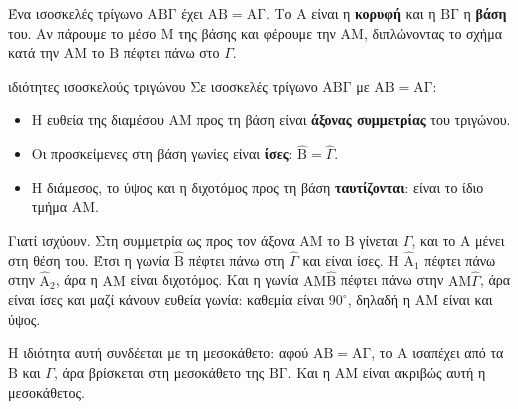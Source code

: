 

Ένα ισοσκελές τρίγωνο $\mathrm{ΑΒΓ}$ έχει $\mathrm{ΑΒ}=\mathrm{ΑΓ}$. Το $\mathrm{Α}$ είναι η \textbf{κορυφή} και η $\mathrm{ΒΓ}$ η \textbf{βάση} του. Αν πάρουμε το μέσο $\mathrm{Μ}$ της βάσης και φέρουμε την $\mathrm{ΑΜ}$, διπλώνοντας το σχήμα κατά την $\mathrm{ΑΜ}$ το $\mathrm{Β}$ πέφτει πάνω στο $\Gamma$.

\begin{center}
\end{center}

\begin{kanonas}{ιδιότητες ισοσκελούς τριγώνου}
Σε ισοσκελές τρίγωνο $\mathrm{ΑΒΓ}$ με $\mathrm{ΑΒ}=\mathrm{ΑΓ}$:
\begin{itemize}[leftmargin=1.2em,itemsep=0.3ex,topsep=2pt]
\item Η ευθεία της διαμέσου $\mathrm{ΑΜ}$ προς τη βάση είναι \textbf{άξονας συμμετρίας} του τριγώνου.
\item Οι προσκείμενες στη βάση γωνίες είναι \textbf{ίσες}: $\hat{\mathrm{Β}}=\hat{\Gamma}$.
\item Η διάμεσος, το ύψος και η διχοτόμος προς τη βάση \textbf{ταυτίζονται}: είναι το ίδιο τμήμα $\mathrm{ΑΜ}$.
\end{itemize}
\end{kanonas}

Γιατί ισχύουν. Στη συμμετρία ως προς τον άξονα $\mathrm{ΑΜ}$ το $\mathrm{Β}$ γίνεται $\Gamma$, και το $\mathrm{Α}$ μένει στη θέση του. Έτσι η γωνία $\hat{\mathrm{Β}}$ πέφτει πάνω στη $\hat{\Gamma}$ και είναι ίσες. Η $\hat{\mathrm{Α}}_1$ πέφτει πάνω στην $\hat{\mathrm{Α}}_2$, άρα η $\mathrm{ΑΜ}$ είναι διχοτόμος. Και η γωνία $\mathrm{ΑΜ}\hat{\mathrm{Β}}$ πέφτει πάνω στην $\mathrm{ΑΜ}\hat{\Gamma}$, άρα είναι ίσες και μαζί κάνουν ευθεία γωνία: καθεμία είναι $90^\circ$, δηλαδή η $\mathrm{ΑΜ}$ είναι και ύψος.

Η ιδιότητα αυτή συνδέεται με τη μεσοκάθετο: αφού $\mathrm{ΑΒ}=\mathrm{ΑΓ}$, το $\mathrm{Α}$ ισαπέχει από τα $\mathrm{Β}$ και $\Gamma$, άρα βρίσκεται στη μεσοκάθετο της $\mathrm{ΒΓ}$. Και η $\mathrm{ΑΜ}$ είναι ακριβώς αυτή η μεσοκάθετος.

